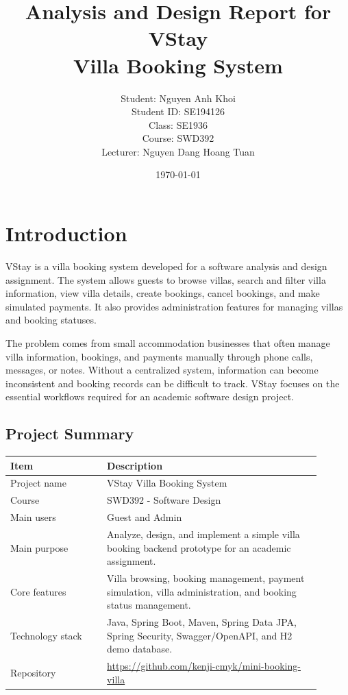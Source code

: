 \documentclass[12pt,a4paper]{article}
\title{\textbf{Analysis and Design Report for VStay}\\
\large Villa Booking System}
\author{
Student: Nguyen Anh Khoi\\
Student ID: SE194126\\
Class: SE1936\\
Course: SWD392\\
Lecturer: Nguyen Dang Hoang Tuan
}
\date{\today}
\begin{document}
\maketitle
\tableofcontents
\newpage

\section{Introduction}

VStay is a villa booking system developed for a software analysis and design assignment. The system allows guests to browse villas, search and filter villa information, view villa details, create bookings, cancel bookings, and make simulated payments. It also provides administration features for managing villas and booking statuses.

The problem comes from small accommodation businesses that often manage villa information, bookings, and payments manually through phone calls, messages, or notes. Without a centralized system, information can become inconsistent and booking records can be difficult to track. VStay focuses on the essential workflows required for an academic software design project.

\subsection{Project Summary}

\begin{longtable}{|L{0.28\linewidth}|L{0.62\linewidth}|}
\hline
\textbf{Item} & \textbf{Description} \\
\hline
Project name & VStay Villa Booking System \\
\hline
Course & SWD392 - Software Design \\
\hline
Main users & Guest and Admin \\
\hline
Main purpose & Analyze, design, and implement a simple villa booking backend prototype for an academic assignment. \\
\hline
Core features & Villa browsing, booking management, payment simulation, villa administration, and booking status management. \\
\hline
Technology stack & Java, Spring Boot, Maven, Spring Data JPA, Spring Security, Swagger/OpenAPI, and H2 demo database. \\
\hline
Repository & \href{https://github.com/kenji-cmyk/mini-booking-villa}{https://github.com/kenji-cmyk/mini-booking-villa} \\
\hline
\end{longtable}
\end{document}
